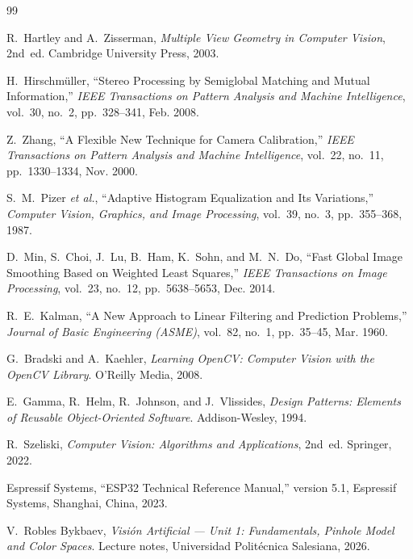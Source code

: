 \documentclass[12pt, a4paper]{article}
\begin{document}
\newpage
\begin{thebibliography}{99}

R.~Hartley and A.~Zisserman,
\textit{Multiple View Geometry in Computer Vision}, 2nd~ed.
Cambridge University Press, 2003.

H.~Hirschm\"uller,
``Stereo Processing by Semiglobal Matching and Mutual Information,''
\textit{IEEE Transactions on Pattern Analysis and Machine Intelligence},
vol.~30, no.~2, pp.~328--341, Feb. 2008.

Z.~Zhang,
``A Flexible New Technique for Camera Calibration,''
\textit{IEEE Transactions on Pattern Analysis and Machine Intelligence},
vol.~22, no.~11, pp.~1330--1334, Nov. 2000.

S.~M.~Pizer \textit{et al.},
``Adaptive Histogram Equalization and Its Variations,''
\textit{Computer Vision, Graphics, and Image Processing},
vol.~39, no.~3, pp.~355--368, 1987.

D.~Min, S.~Choi, J.~Lu, B.~Ham, K.~Sohn, and M.~N.~Do,
``Fast Global Image Smoothing Based on Weighted Least Squares,''
\textit{IEEE Transactions on Image Processing},
vol.~23, no.~12, pp.~5638--5653, Dec. 2014.

R.~E.~Kalman,
``A New Approach to Linear Filtering and Prediction Problems,''
\textit{Journal of Basic Engineering (ASME)},
vol.~82, no.~1, pp.~35--45, Mar. 1960.

G.~Bradski and A.~Kaehler,
\textit{Learning OpenCV: Computer Vision with the OpenCV Library}.
O'Reilly Media, 2008.

E.~Gamma, R.~Helm, R.~Johnson, and J.~Vlissides,
\textit{Design Patterns: Elements of Reusable Object-Oriented Software}.
Addison-Wesley, 1994.

R.~Szeliski,
\textit{Computer Vision: Algorithms and Applications}, 2nd~ed.
Springer, 2022.

Espressif Systems,
``ESP32 Technical Reference Manual,'' version 5.1,
Espressif Systems, Shanghai, China, 2023.

V.~Robles Bykbaev,
\textit{Visi\'on Artificial --- Unit 1: Fundamentals, Pinhole Model and Color Spaces}.
Lecture notes, Universidad Polit\'ecnica Salesiana, 2026.


\end{thebibliography}
\end{document}
